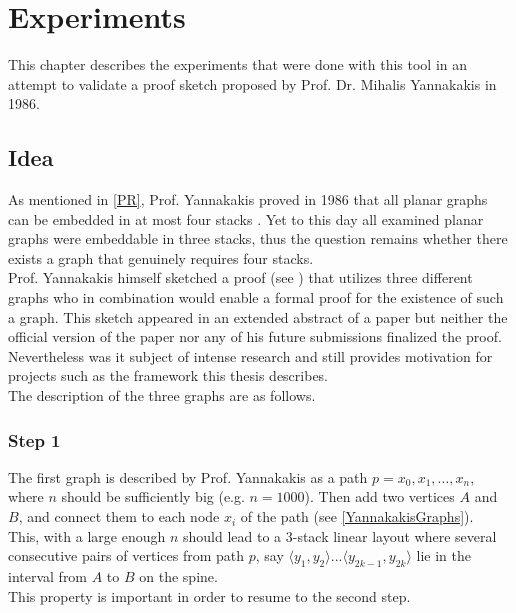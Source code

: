 
\chapter{Experiments}
  \label{Exp}
  
This chapter describes the experiments\cite{bekos2019} that were done with this tool in an attempt to validate a proof sketch proposed by Prof. Dr. Mihalis Yannakakis \cite{yannakakis1986four} in 1986.\\
\section{Idea}
As mentioned in \autoref{PR}, Prof. Yannakakis proved in 1986 that all planar graphs can be embedded in at most four stacks \cite{yannakakis1986four,yannakakis1989embedding}. Yet to this day all examined planar graphs were embeddable in three stacks, thus the question remains whether there exists a graph that genuinely requires four stacks.\\
Prof. Yannakakis himself sketched a proof (see \cite{yannakakis1986four}) that utilizes three different graphs who in combination would enable a formal proof for the existence of such a graph. This sketch appeared in an extended abstract of a paper but neither the official version of the paper nor any of his future submissions finalized the proof.
Nevertheless was it subject of intense research and still provides motivation for projects such as the framework this thesis describes.\\
The description of the three graphs are as follows.
\subsection{Step 1}
\label{S1}
The first graph is described by Prof. Yannakakis as a path $p = x_0,x_1,...,x_n$, where $n$ should be sufficiently big (e.g. $n = 1000$). Then add two vertices $A$ and $B$, and connect them to each node $x_i$ of the path (see \autoref{YannakakisGraphs}).\\
This, with a large enough $n$ should lead to a 3-stack linear layout where several consecutive pairs of vertices from path $p$, say  $\langle y_1,y_2 \rangle ... \langle y_{2k-1}, y_{2k}\rangle$ lie in the interval from $A$ to $B$ on the spine.\\
This property is important in order to resume to the second step.
